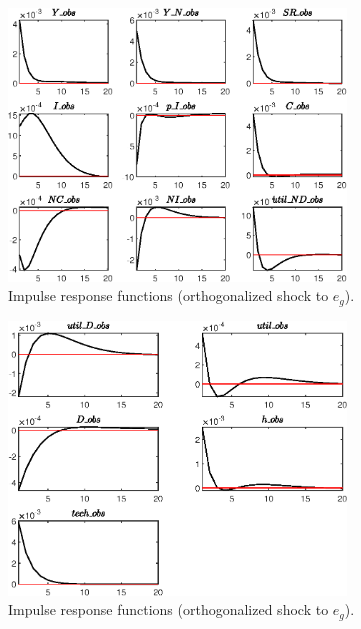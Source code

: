  
\begin{figure}[H]
\centering 
\includegraphics[width=0.80\textwidth]{BRS_sectoral/graphs/BRS_sectoral_IRF_e_g1}
\caption{Impulse response functions (orthogonalized shock to ${e_g}$).}\label{Fig:IRF:e_g:1}
\end{figure}
 
\begin{figure}[H]
\centering 
\includegraphics[width=0.80\textwidth]{BRS_sectoral/graphs/BRS_sectoral_IRF_e_g2}
\caption{Impulse response functions (orthogonalized shock to ${e_g}$).}\label{Fig:IRF:e_g:2}
\end{figure}
 
